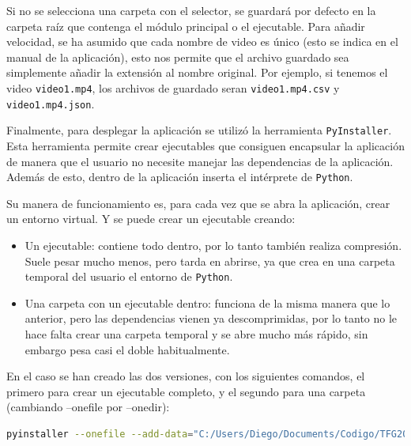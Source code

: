 Si no se selecciona una carpeta con el selector, se guardará por defecto en la carpeta raíz que contenga el módulo principal o el ejecutable.\newline
Para añadir velocidad, se ha asumido que cada nombre de video es único (esto se indica en el manual de la aplicación), esto nos permite que el archivo guardado sea simplemente añadir la extensión al nombre original. 
Por ejemplo, si tenemos el video \verb|video1.mp4|, los archivos de guardado seran \verb|video1.mp4.csv| y \verb|video1.mp4.json|.

\vspace{3\baselineskip}

Finalmente, para desplegar la aplicación se utilizó la herramienta \texttt{PyInstaller}. Esta herramienta permite crear ejecutables que consiguen encapsular la aplicación de manera que el usuario no necesite 
manejar las dependencias de la aplicación. Además de esto, dentro de la aplicación inserta el intérprete de \texttt{Python}.

Su manera de funcionamiento es, para cada vez que se abra la aplicación, crear un entorno virtual. Y se puede crear un ejecutable creando:
\begin{itemize}
    \item Un ejecutable: contiene todo dentro, por lo tanto también realiza compresión. Suele pesar mucho menos, pero tarda en abrirse, ya que crea en una carpeta temporal del usuario el entorno de \texttt{Python}.
    \item Una carpeta con un ejecutable dentro: funciona de la misma manera que lo anterior, pero las dependencias vienen ya descomprimidas, por lo tanto no le hace falta crear una carpeta temporal y se abre mucho 
    más rápido, sin embargo pesa casi el doble habitualmente.
\end{itemize}

En el caso se han creado las dos versiones, con los siguientes comandos, el primero para crear un ejecutable completo, y el segundo para una carpeta (cambiando --onefile por --onedir):
\begin{lstlisting}[language=bash,breaklines=true]
    pyinstaller --onefile --add-data="C:/Users/Diego/Documents/Codigo/TFG2024/.venv/Lib/site-packages/ultralytics":"ultralytics/" --add-binary="C:/Users/Diego/Documents/Codigo/TFG2024/.venv/Lib/site-packages/openvino/libs":"." --hidden-import openvino --collect-submodules openvino --collect-binaries openvino --collect-data openvino --hidden-import onnx --hidden-import onnxruntime  .\main.py
\end{lstlisting}

